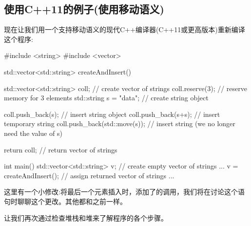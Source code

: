 \subsection{使用C++11的例子(使用移动语义)}

现在让我们用一个支持移动语义的现代C++编译器(C++11或更高版本)重新编译这个程序:

\begin{cppcode}
#include <string>
#include <vector>

std::vector<std::string> createAndInsert()
{
	std::vector<std::string> coll; // create vector of strings
	coll.reserve(3); // reserve memory for 3 elements
	std::string s = "data"; // create string object

	coll.push_back(s); // insert string object
	coll.push_back(s+s); // insert temporary string
	coll.push_back(std::move(s)); // insert string (we no longer need the value of s)

	return coll; // return vector of strings
}

int main()
{
	std::vector<std::string> v; // create empty vector of strings
	...
	v = createAndInsert(); // assign returned vector of strings
	...
}
\end{cppcode}

这里有一个小修改:将最后一个元素插入时，添加了的调用，我们将在讨论这个语句时聊聊这个更改。其他都和之前一样。

让我们再次通过检查堆栈和堆来了解程序的各个步骤。

